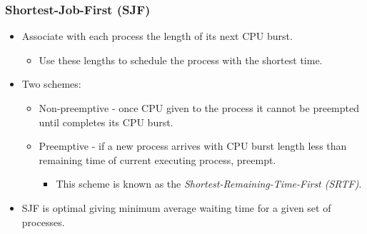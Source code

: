 \documentclass[CJKutf8,xcolor=pdftex,dvipsnames,table]{beamer}
\begin{document}
\begin{CJK*}{UTF8}{song}
  \begin{frame}
  \frametitle{Shortest-Job-First (SJF)} \pause
  \begin{itemize}
  \item{Associate with each process the length of its next CPU burst.} \pause
    \begin{itemize}
    \item{Use these lengths to schedule the process with the shortest time.} \pause
    \end{itemize}
  \item{Two schemes:} \pause
    \begin{itemize}
    \item{Non-preemptive \pause - once CPU given to the process it cannot be preempted until completes its CPU burst.} \pause
    \item{Preemptive \pause - if a new process arrives with CPU burst length less than remaining time of current executing process, preempt.} \pause
      \begin{itemize}
      \item{This scheme is known as the \emph{Shortest-Remaining-Time-First (SRTF)}.} \pause
      \end{itemize}
    \end{itemize}
  \item{SJF is optimal giving minimum average waiting time for a given set of processes.}
  \end{itemize}
  \end{frame}
  

\end{CJK*}
\end{document}
